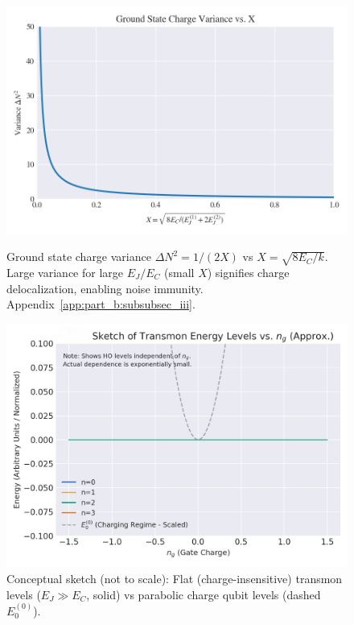 \documentclass[12pt]{article}
\begin{document}
\begin{figure}[htbp] 
    \centering
    \begin{minipage}{0.49\textwidth}
        \centering
        \includegraphics[width=\textwidth]{fig_delta_n_variance.png}
        \caption{Ground state charge variance $\Delta N^2 = 1/(2X)$ vs $X = \sqrt{8 E_C / k}$. Large variance for large $E_J/E_C$ (small $X$) signifies charge delocalization, enabling noise immunity. Appendix~\ref{app:part_b:subsubsec_iii}.}
        \label{fig:main_delta_n_variance_condensed} 
    \end{minipage}\hfill 
    \begin{minipage}{0.49\textwidth}
        \centering
        \includegraphics[width=\textwidth]{fig_transmon_levels.png}
        \caption{Conceptual sketch (not to scale): Flat (charge-insensitive) transmon levels ($E_J \gg E_C$, solid) vs parabolic charge qubit levels (dashed $E_0^{(0)}$).} 
        \label{fig:main_transmon_levels_condensed} 
    \end{minipage}
\end{figure}
\end{document}
